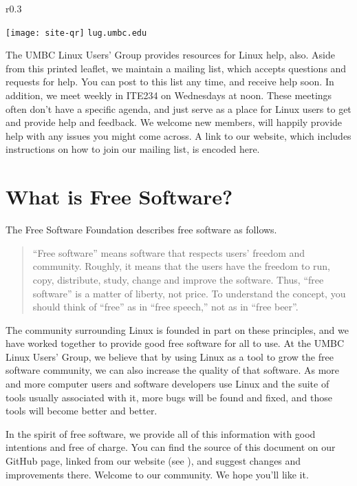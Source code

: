 \documentclass[11pt,notumble]{leaflet}
\begin{document}
\begin{wrapfigure}{r}{0.3\textwidth}
    \vspace{-3em}
    \begin{center}
        \texttt{[image: site-qr]}
        \vspace{-2em}
        \texttt{lug.umbc.edu}
    \end{center}
\end{wrapfigure}

The UMBC Linux Users' Group provides resources for Linux help, also. Aside from
this printed leaflet, we maintain a mailing list, which accepts questions and
requests for help. You can post to this list any time, and receive help soon. In
addition, we meet weekly in ITE234 on Wednesdays at noon. These meetings often
don't have a specific agenda, and just serve as a place for Linux users to get
and provide help and feedback. We welcome new members, will happily provide help
with any issues you might come across. A link to our website, which includes
instructions on how to join our mailing list, is encoded here.

\section{What is Free Software?}
\label{section:free-software}

The Free Software Foundation describes free software as follows.

\begin{quote}
    “Free software” means software that respects users' freedom and community.
    Roughly, it means that the users have the freedom to run, copy, distribute,
    study, change and improve the software. Thus, “free software” is a matter of
    liberty, not price. To understand the concept, you should think of “free” as
    in “free speech,” not as in “free beer”.
\end{quote}

The community surrounding Linux is founded in part on these principles, and we
have worked together to provide good free software for all to use. At the UMBC
Linux Users' Group, we believe that by using Linux as a tool to grow the free
software community, we can also increase the quality of that software. As more
and more computer users and software developers use Linux and the suite of tools
usually associated with it, more bugs will be found and fixed, and those tools
will become better and better.

In the spirit of free software, we provide all of this information with good
intentions and free of charge. You can find the source of this document on our
GitHub page, linked from our website (see ), and
suggest changes and improvements there. Welcome to our community. We hope you'll
like it.
\end{document}
